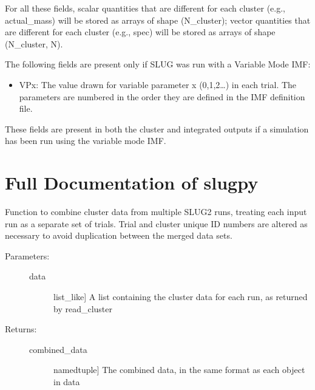 \documentclass[letterpaper,10pt,english]{sphinxmanual}
\begin{document}
For all these fields, scalar quantities that are different for each cluster (e.g., actual\_mass) will be stored as arrays of shape (N\_cluster); vector quantities that are different for each cluster (e.g., spec) will be stored as arrays of shape (N\_cluster, N).

The following fields are present only if SLUG was run with a Variable Mode IMF:
\begin{itemize}
\item {} 
VPx: The value drawn for variable parameter x (0,1,2…) in each trial. The parameters are numbered in the order they are defined in the IMF definition file.

\end{itemize}

These fields are present in both the cluster and integrated outputs if a simulation has been run using the variable mode IMF.


\section{Full Documentation of slugpy}
\label{\detokenize{slugpy:full-documentation-of-slugpy}}\label{\detokenize{slugpy:module-slugpy}}

\begin{fulllineitems}
\label{\detokenize{slugpy:slugpy.combine_cluster}}
Function to combine cluster data from multiple SLUG2 runs,
treating each input run as a separate set of trials. Trial and
cluster unique ID numbers are altered as necessary to avoid
duplication between the merged data sets.
\begin{description}
\item[{Parameters:}] \leavevmode\begin{description}
\item[{data}] \leavevmode{[}list\_like{]}
A list containing the cluster data for each run, as
returned by read\_cluster

\end{description}

\item[{Returns:}] \leavevmode\begin{description}
\item[{combined\_data}] \leavevmode{[}namedtuple{]}
The combined data, in the same format as each object in data

\end{description}

\end{description}

\end{fulllineitems}
\end{document}

